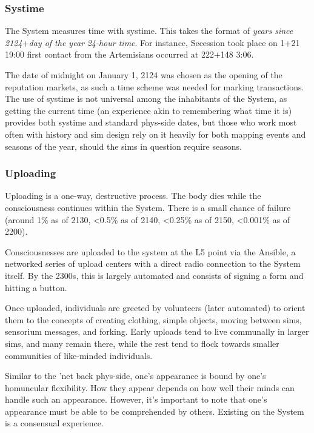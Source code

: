 \subsubsection{Systime}

The System measures time with systime. This takes the format of \emph{years since 2124}+\emph{day of the year} \emph{24-hour time}. For instance, Secession took place on 1+21 19:00 first contact from the Artemisians occurred at 222+148 3:06.

The date of midnight on January 1, 2124 was chosen as the opening of the reputation markets, as such a time scheme was needed for marking transactions. The use of systime is not universal among the inhabitants of the System, as getting the current time (an experience akin to remembering what time it is) provides both systime and standard phys-side dates, but those who work most often with history and sim design rely on it heavily for both mapping events and seasons of the year, should the sims in question require seasons.

\subsubsection{Uploading}

Uploading is a one-way, destructive process. The body dies while the consciousness continues within the System. There is a small chance of failure (around 1\% as of 2130, \textless0.5\% as of 2140, \textless0.25\% as of 2150, \textless0.001\% as of 2200).

Consciousnesses are uploaded to the system at the L5 point via the Ansible, a networked series of upload centers with a direct radio connection to the System itself. By the 2300s, this is largely automated and consists of signing a form and hitting a button.

Once uploaded, individuals are greeted by volunteers (later automated) to orient them to the concepts of creating clothing, simple objects, moving between sims, sensorium messages, and forking. Early uploads tend to live communally in larger sims, and many remain there, while the rest tend to flock towards smaller communities of like-minded individuals.

Similar to the 'net back phys-side, one's appearance is bound by one's homuncular flexibility. How they appear depends on how well their minds can handle such an appearance. However, it's important to note that one's appearance must be able to be comprehended by others. Existing on the System is a consensual experience.

